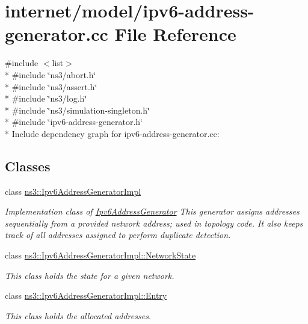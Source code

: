 \hypertarget{ipv6-address-generator_8cc}{}\section{internet/model/ipv6-\/address-\/generator.cc File Reference}
\label{ipv6-address-generator_8cc}
{\ttfamily \#include $<$list$>$}\\*
{\ttfamily \#include \char`\"{}ns3/abort.\+h\char`\"{}}\\*
{\ttfamily \#include \char`\"{}ns3/assert.\+h\char`\"{}}\\*
{\ttfamily \#include \char`\"{}ns3/log.\+h\char`\"{}}\\*
{\ttfamily \#include \char`\"{}ns3/simulation-\/singleton.\+h\char`\"{}}\\*
{\ttfamily \#include \char`\"{}ipv6-\/address-\/generator.\+h\char`\"{}}\\*
Include dependency graph for ipv6-\/address-\/generator.cc\+:
\subsection*{Classes}
\begin{DoxyCompactItemize}
\item 
class \hyperlink{classns3_1_1Ipv6AddressGeneratorImpl}{ns3\+::\+Ipv6\+Address\+Generator\+Impl}
\begin{DoxyCompactList}\small\item\em Implementation class of \hyperlink{classns3_1_1Ipv6AddressGenerator}{Ipv6\+Address\+Generator} This generator assigns addresses sequentially from a provided network address; used in topology code. It also keeps track of all addresses assigned to perform duplicate detection. \end{DoxyCompactList}\item 
class \hyperlink{classns3_1_1Ipv6AddressGeneratorImpl_1_1NetworkState}{ns3\+::\+Ipv6\+Address\+Generator\+Impl\+::\+Network\+State}
\begin{DoxyCompactList}\small\item\em This class holds the state for a given network. \end{DoxyCompactList}\item 
class \hyperlink{classns3_1_1Ipv6AddressGeneratorImpl_1_1Entry}{ns3\+::\+Ipv6\+Address\+Generator\+Impl\+::\+Entry}
\begin{DoxyCompactList}\small\item\em This class holds the allocated addresses. \end{DoxyCompactList}\end{DoxyCompactItemize}
